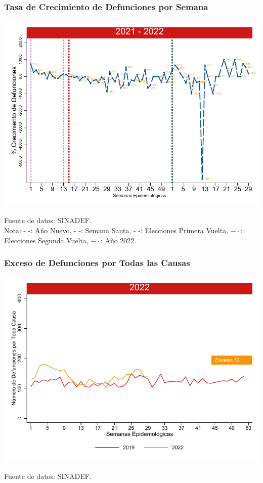 \documentclass[xcolor=table]{beamer}
\begin{document}
	\begin{frame}
		\frametitle{Tasa de Crecimiento de Defunciones por Semana}
		\vspace{-.5cm}
		\begin{center}
			\includegraphics[width=0.9\linewidth]{../figuras/defunciones_tasa_crecimiento_21_22.pdf}
		\end{center} 
		{\tiny Fuente de datos: SINADEF. \\
			Nota: {\color{mycolor1} - -: Año Nuevo}, {\color{mycolor2} - -: Semana Santa}, {\color{mycolor3} - -: Elecciones Primera Vuelta}, {\color{mycolor4} $- \cdot$: Elecciones Segunda Vuelta}, {\color{mycolor7} $- \cdot$: Año 2022}. \\}
	\end{frame}

	\begin{frame}
		\frametitle{Exceso de Defunciones por Todas las Causas}
		\vspace{-.5cm}
		\begin{center}
			\includegraphics[width=0.9\linewidth]{../figuras/exceso_region_2022.pdf}
		\end{center}
		{\tiny Fuente de datos: SINADEF.} 
	\end{frame}
	
\end{document}
